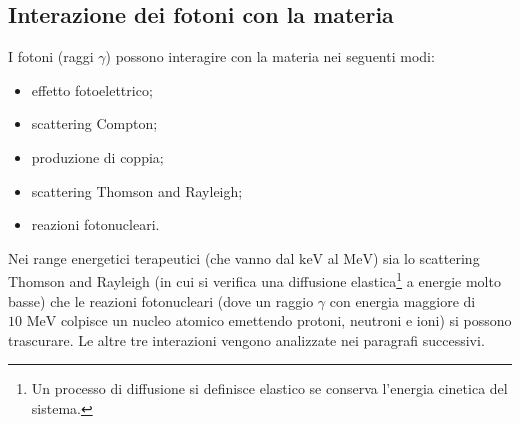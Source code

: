 \documentclass[12pt,a4paper,twoside]{report}
\begin{document}
	\subsection{Interazione dei fotoni con la materia}
	I fotoni (raggi $\gamma$) possono interagire con la materia nei seguenti modi:
	\begin{itemize}
		\item effetto fotoelettrico;
		\item scattering Compton;
		\item produzione di coppia;
		\item scattering Thomson and Rayleigh;
		\item reazioni fotonucleari.
	\end{itemize}
	Nei range energetici terapeutici (che vanno dal $\mbox{keV}$ al $\mbox{MeV}$) sia lo scattering Thomson and Rayleigh (in cui si verifica una diffusione elastica\footnote{Un processo di diffusione si definisce elastico se conserva l'energia cinetica del sistema.} a energie molto basse) che le reazioni fotonucleari (dove un raggio $\gamma$ con energia maggiore di $10\mbox{ MeV}$ colpisce un nucleo atomico emettendo protoni, neutroni e ioni) si possono trascurare. Le altre tre interazioni vengono analizzate nei paragrafi successivi.
	
\end{document}
